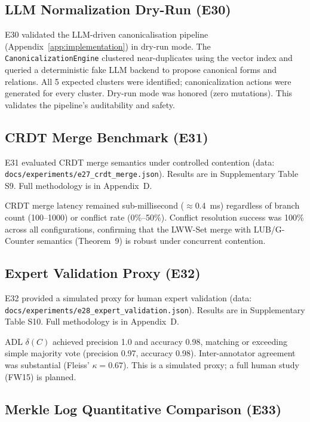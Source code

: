 \subsection{LLM Normalization Dry-Run (E30)}\label{subsec:e30}

E30 validated the LLM-driven canonicalisation pipeline (Appendix~\ref{app:implementation}) in dry-run mode. The \texttt{CanonicalizationEngine} clustered near-duplicates using the vector index and queried a deterministic fake LLM backend to propose canonical forms and relations. All 5 expected clusters were identified; canonicalization actions were generated for every cluster. Dry-run mode was honored (zero mutations). This validates the pipeline's auditability and safety.

\subsection{CRDT Merge Benchmark (E31)}\label{subsec:e31}

E31 evaluated CRDT merge semantics under controlled contention (data: \texttt{docs/experiments/e27\_crdt\_merge.json}). Results are in Supplementary Table S9. Full methodology is in Appendix~D.


CRDT merge latency remained sub-millisecond ($\approx$0.4~ms) regardless of branch count (100--1000) or conflict rate (0\%--50\%). Conflict resolution success was 100\% across all configurations, confirming that the LWW-Set merge with LUB/G-Counter semantics (Theorem~9) is robust under concurrent contention.

\subsection{Expert Validation Proxy (E32)}\label{subsec:e32}

E32 provided a simulated proxy for human expert validation (data: \texttt{docs/experiments/e28\_expert\_validation.json}). Results are in Supplementary Table S10. Full methodology is in Appendix~D.


ADL $\delta(C)$ achieved precision 1.0 and accuracy 0.98, matching or exceeding simple majority vote (precision 0.97, accuracy 0.98). Inter-annotator agreement was substantial (Fleiss' $\kappa = 0.67$). This is a simulated proxy; a full human study (FW15) is planned.

\subsection{Merkle Log Quantitative Comparison (E33)}\label{subsec:e33}

